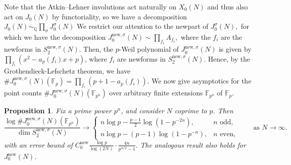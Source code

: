 \documentclass[11pt,letterpaper,reqno]{amsart}
\newtheorem{proposition}[theorem]{Proposition}
\theoremstyle{definition}
\numberwithin{equation}{section}
\numberwithin{figure}{section}
\numberwithin{table}{section}
\newcommand{\nw}{\mathrm{new}}
\begin{document}
Note that the Atkin--Lehner involutions act naturally on $X_0(N)$ and thus also act on $J_0(N)$ by functoriality, so we have a decomposition $J_0 (N) \sim_{\mathbb{Q}} \prod_{\sigma} J_0^{\sigma}(N)$ We restrict our attention to the newpart of $J_0^{\sigma}(N),$ for which we have the decomposition $J_0^{\nw,\sigma}(N) \sim \prod_{f_i} A_{f_i},$ where the $f_i$ are the newforms in $S_2^{\nw, \sigma}(N).$ Then, the $p$-Weil polynomial of $J_0^{\nw, \sigma}(N)$ is given by $\prod_{f_i} (x^2 - a_p(f_i)x + p)$, where $f_i$ are newforms in $S_2^{\text{new}, \sigma}(N)$.  Hence, by the Grothendieck-Lefschetz theorem, we have $\#J_0^{\nw,\sigma}(N)(\mathbb{F}_p) = \prod_{f_i} (p+1 - a_p(f_i)).$  We now give asymptotics for the point counts $\#J_0^{\nw,\sigma}(N)(\mathbb{F}_{p^n})$ over arbitrary finite extensions $\mathbb F_{p^n}$ of $\mathbb F_p$.


\begin{proposition}
\label{prop:asymptotic-point-count-Jacobian-q}
Fix a prime power $p^n$, and consider $N$ coprime to $p$. Then
\[
\frac{\log \#J_0^{\nw,\sigma}(N)(\mathbb F_{p^n})}
     {\dim S_2^{\nw, \sigma}(N)}
\longrightarrow
\begin{cases}
\displaystyle n\log p - \frac{p-1}{2}\log\!\left(1-p^{-2n}\right),
& \text{$n$ odd},\\[10pt]
\displaystyle n\log p - (p-1)\log\!\left(1- p^{-n}\right),
& \text{$n$ even},
\end{cases}
\qquad\text{as }N\to\infty.
\]
with an error bound of $C_0^{\nw}
\frac{\log p}
     {\log(2N)} \cdot \frac{4n}{p^{n/2} - 1}.$ The analogous result also holds for $J_0^{\nw}(N)$.
\end{proposition}
\end{document}
